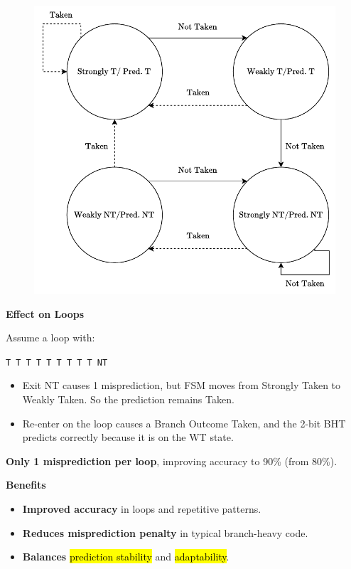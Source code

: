 \begin{figure}[!htp]
    \centering
    \includegraphics[width=\textwidth]{img/fsm-2-bit-bht.pdf}
\end{figure}

\highspace
\begin{flushleft}
    \textcolor{Green3}{ \textbf{Effect on Loops}}
\end{flushleft}
Assume a loop with:
\begin{center}
    \texttt{T T T T T T T T T NT}
\end{center}
\begin{itemize}
    \item Exit NT causes 1 misprediction, but FSM moves from Strongly Taken to Weakly Taken. So the prediction remains Taken.
    \item Re-enter on the loop causes a Branch Outcome Taken, and the 2-bit BHT predicts correctly because it is on the WT state.
\end{itemize}
\textbf{Only 1 misprediction per loop}, improving accuracy to 90\% (from 80\%).

\highspace
\begin{flushleft}
    \textcolor{Green3}{ \textbf{Benefits}}
\end{flushleft}
\begin{itemize}
    \item \textbf{Improved accuracy} in loops and repetitive patterns.
    \item \textbf{Reduces misprediction penalty} in typical branch-heavy code.
    \item \textbf{Balances} \hl{prediction stability} and \hl{adaptability}.
\end{itemize}